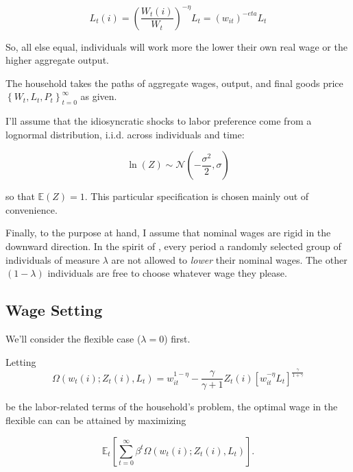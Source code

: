 \documentclass[12pt,a4paper]{scrartcl}            %
\begin{document}
\begin{equation}
    \label{eq:labor_demand}
    L_t(i) = \left( \frac{W_t(i)}{W_t} \right)^{-\eta}L_t = (w_{it})^{-eta}L_t
\end{equation}

So, all else equal, individuals will work more the lower their own real wage or the higher aggregate output.

The household takes the paths of aggregate wages, output, and final goods price $\left\{W_t, L_t, P_t \right\}_{t=0}^{\infty}$ as given.

I'll assume that the idiosyncratic shocks to labor preference come from a lognormal distribution, i.i.d. across individuals and time:

\begin{equation}
    \label{eq:shock_dist}
    \ln(Z) \sim \mathcal{N}\left(-\frac{\sigma^2}{2}, \sigma\right)
\end{equation}

so that $\mathbb{E}(Z) = 1$.
This particular specification is chosen mainly out of convenience.

Finally, to the purpose at hand, I assume that nominal wages are rigid in the downward direction.
In the spirit of \cite{calvo_1983}, every period a randomly selected group of individuals of measure $\lambda$ are not allowed to \emph{lower} their nominal wages.
The other $(1 - \lambda)$ individuals are free to choose whatever wage they please.
\subsection{Wage Setting}
\label{sub:wage_setting}

We'll consider the flexible case ($\lambda = 0$) first.

Letting
\begin{equation}
    \label{eq:labor_part}
    \Omega( w_t(i); Z_t(i), L_t ) = w_{it}^{1 - \eta} - \frac{\gamma}{\gamma + 1}Z_t(i)\left[ w_{it}^{-\eta}L_t \right]^{\frac{\gamma}{1 + \gamma}}
\end{equation}

be the labor-related terms of the household's problem, the optimal wage in the flexible can can be attained by maximizing

\begin{equation}
    \label{eq:labor_opt}
    \mathbb{E}_t\left[\sum_{t=0}^{\infty}\beta^t \Omega( w_t(i); Z_t(i), L_t ) \right].
\end{equation}
\end{document}
